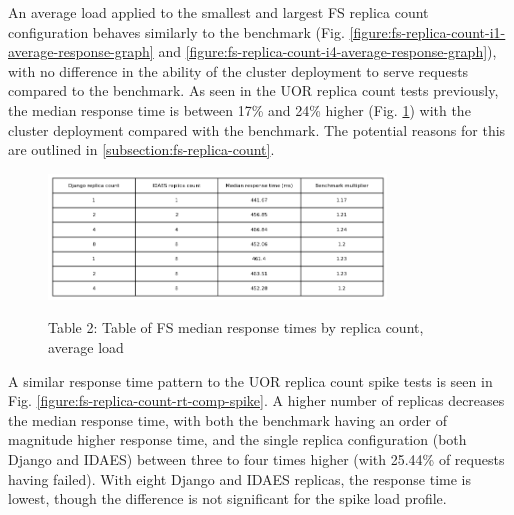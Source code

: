 \noindent An average load applied to the smallest and largest FS replica count configuration behaves similarly to the benchmark (Fig. \ref{figure:fs-replica-count-i1-average-response-graph} and \ref{figure:fs-replica-count-i4-average-response-graph}), with no difference in the ability of the cluster deployment to serve requests compared to the benchmark. As seen in the UOR replica count tests previously, the median response time is between 17\% and 24\% higher (Fig. \ref{figure:fs-response-time-table-average}) with the cluster deployment compared with the benchmark. The potential reasons for this are outlined in \ref{subsection:fs-replica-count}.

\begin{figure}[H]
    \captionsetup{labelformat=empty} %
    \caption{Table 2: Table of FS median response times by replica count, average load}

    \centering
    \includegraphics[width=0.8\textwidth]{figures/fs-replica-count-rt-comparison.png}
    \label{figure:fs-response-time-table-average}
\end{figure}

A similar response time pattern to the UOR replica count spike tests is seen in Fig. \ref{figure:fs-replica-count-rt-comp-spike}. A higher number of replicas decreases the median response time, with both the benchmark having an order of magnitude higher response time, and the single replica configuration (both Django and IDAES) between three to four times higher (with 25.44\% of requests having failed). With eight Django and IDAES replicas, the response time is lowest, though the difference is not significant for the spike load profile.

